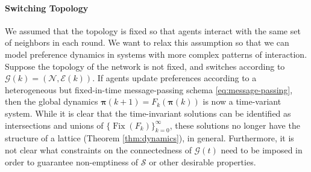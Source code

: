 \documentclass[conference]{ieeeconf}
\newcommand{\N}{\mathcal{N}}
\newcommand{\A}{\mathcal{A}}
\renewcommand{\S}{\mathcal{S}}
\newcommand{\G}{\mathcal{G}}
\newcommand{\E}{\mathcal{E}}
\newcommand{\Pref}{\mathsf{Pre}}
\newcommand{\profile}{\boldsymbol{\pi}}
\renewcommand{\geq}{\geqslant}
\DeclareMathOperator{\Fix}{Fix}
\newtheorem{proposition}{Proposition}
\begin{document}
\paragraph*{Switching Topology}
We assumed that the topology is fixed so that agents interact with the same set of neighbors in each round. We want to relax this assumption so that we can model preference dynamics in systems with more complex patterns of interaction. Suppose the topology of the network is not fixed, and switches according to $\G(k) = \left(\N, \E(k)\right)$. If agents update preferences according to a heterogeneous but fixed-in-time message-passing schema \eqref{eq:message-passing}, then the global dynamics $\profile(k+1) = F_k\left( \profile(k)\right)$ is now a time-variant system.
While it is clear that the time-invariant solutions can be identified as intersections and unions of $\{\Fix(F_k)\}_{k = 0}^{\infty}$, these solutions no longer have the structure of a lattice (Theorem \ref{thm:dynamics}), in general. Furthermore, it is not clear what constraints on the connectedness of $\G(t)$ need to be imposed in order to guarantee  non-emptiness of $\S$ or other desirable properties.





\appendix
\end{document}
